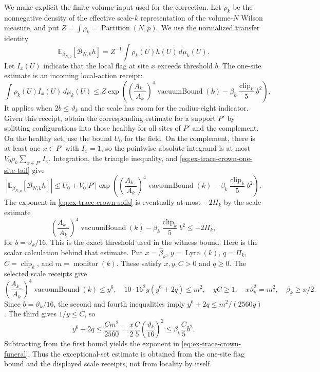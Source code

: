 We make explicit the finite-volume input used for the correction. Let
$\rho_k$ be the nonnegative density of the effective scale-$k$ representation
of the volume-$N$ Wilson measure, and put
$Z=\int\rho_k=\operatorname{Partition}(N,p)$. We use the normalized transfer
identity
\begin{equation}
 \mathbb E_{\beta_{N,p}}[\mathcal B_{N,k}h]
   =Z^{-1}\int \rho_k(U)h(U)\,d\mu_k(U).
 \label{eq:ex-trace-crown-transfer}
\end{equation}
Let $I_x(U)$ indicate that the local flag at site $x$ exceeds threshold $b$.
The one-site estimate is an incoming local-action receipt:
\begin{equation}
 \int \rho_k(U) I_x(U)\,d\mu_k(U)
 \le Z\exp\!\left(
   \left(\frac{A_{k_-}}{A_k}\right)^4\!\operatorname{vacuumBound}(k)
   -\beta_k\frac{\operatorname{clip}_k}{5}b^2\right).
 \label{eq:ex-trace-crown-one-site-tail}
\end{equation}
It applies when $2b\le\vartheta_k$ and the scale has room for the radius-eight
indicator. Given this receipt, obtain the corresponding estimate for a
support $P'$ by splitting
configurations into those healthy for all sites of $P'$ and the complement.
On the healthy set, use the bound $U_0$ for the field. On the complement,
there is at least one $x\in P'$ with $I_x=1$, so the pointwise absolute
integrand is at most $V_0\rho_k\sum_{x\in P'}I_x$. Integration, the triangle
inequality, and \eqref{eq:ex-trace-crown-one-site-tail} give
\begin{equation}
 |\mathbb E_{\beta_{N,p}}[\mathcal B_{N,k}h]|
 \le U_0+V_0|P'|\exp\!\left(
   \left(\frac{A_{k_-}}{A_k}\right)^4\!\operatorname{vacuumBound}(k)
   -\beta_k\frac{\operatorname{clip}_k}{5}b^2\right).
 \label{eq:ex-trace-crown-soils}
\end{equation}
The exponent in \eqref{eq:ex-trace-crown-soils} is eventually at most
$-2\Pi_k$ by the scale estimate
\begin{equation}
 \left(\frac{A_{k_-}}{A_k}\right)^4\!\operatorname{vacuumBound}(k)
 -\beta_k\frac{\operatorname{clip}_k}{5}b^2\le -2\Pi_k,
 \label{eq:ex-trace-crown-funeral}
\end{equation}
for $b=\vartheta_k/16$. This is the exact threshold used in the witness
bound. Here is the scalar calculation behind that estimate. Put
$x=\widehat\beta_k$, $y=\operatorname{Lyra}(k)$, $q=\Pi_k$,
$C=\operatorname{clip}_k$, and $m=\operatorname{monitor}(k)$. These satisfy
$x,y,C>0$ and $q\ge0$. The selected scale receipts give
\[
 \left(\frac{A_{k_-}}{A_k}\right)^4\operatorname{vacuumBound}(k)\le y^6,
 \quad 10\cdot16^2 y(y^6+2q)\le m^2,
 \quad yC\ge1,
 \quad x\vartheta_k^2=m^2,
 \quad \beta_k\ge x/2.
\]
Since $b=\vartheta_k/16$, the second and fourth inequalities imply
$y^6+2q\le m^2/(2560y)$. The third gives $1/y\le C$, so
\[
 y^6+2q\le \frac{Cm^2}{2560}
 =\frac{x}{2}\frac C5\left(\frac{\vartheta_k}{16}\right)^2
 \le \beta_k\frac C5 b^2.
\]
Subtracting from the first bound yields the exponent in
\eqref{eq:ex-trace-crown-funeral}. Thus the exceptional-set estimate is
obtained from the one-site flag bound and the displayed scale receipts, not
from locality by itself.

